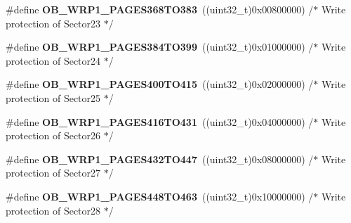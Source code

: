 \begin{DoxyCompactItemize}
\item 
\hypertarget{group___f_l_a_s_h_ex___option___bytes___write___protection1_gab63edd9507ffc8a666133e9735efe17d}{\#define {\bfseries O\-B\-\_\-\-W\-R\-P1\-\_\-\-P\-A\-G\-E\-S368\-T\-O383}~((uint32\-\_\-t)0x00800000) /$\ast$ Write protection of Sector23 $\ast$/}\label{group___f_l_a_s_h_ex___option___bytes___write___protection1_gab63edd9507ffc8a666133e9735efe17d}

\item 
\hypertarget{group___f_l_a_s_h_ex___option___bytes___write___protection1_ga472584f0513bbaf9c290be53cfcff550}{\#define {\bfseries O\-B\-\_\-\-W\-R\-P1\-\_\-\-P\-A\-G\-E\-S384\-T\-O399}~((uint32\-\_\-t)0x01000000) /$\ast$ Write protection of Sector24 $\ast$/}\label{group___f_l_a_s_h_ex___option___bytes___write___protection1_ga472584f0513bbaf9c290be53cfcff550}

\item 
\hypertarget{group___f_l_a_s_h_ex___option___bytes___write___protection1_gaffe45cf6ef12157253e8cd4d8198ddfc}{\#define {\bfseries O\-B\-\_\-\-W\-R\-P1\-\_\-\-P\-A\-G\-E\-S400\-T\-O415}~((uint32\-\_\-t)0x02000000) /$\ast$ Write protection of Sector25 $\ast$/}\label{group___f_l_a_s_h_ex___option___bytes___write___protection1_gaffe45cf6ef12157253e8cd4d8198ddfc}

\item 
\hypertarget{group___f_l_a_s_h_ex___option___bytes___write___protection1_ga303b2306543406e7e3e248950b2cb6a3}{\#define {\bfseries O\-B\-\_\-\-W\-R\-P1\-\_\-\-P\-A\-G\-E\-S416\-T\-O431}~((uint32\-\_\-t)0x04000000) /$\ast$ Write protection of Sector26 $\ast$/}\label{group___f_l_a_s_h_ex___option___bytes___write___protection1_ga303b2306543406e7e3e248950b2cb6a3}

\item 
\hypertarget{group___f_l_a_s_h_ex___option___bytes___write___protection1_ga6da4ac653ed25a8ceb52d4aeed47b63a}{\#define {\bfseries O\-B\-\_\-\-W\-R\-P1\-\_\-\-P\-A\-G\-E\-S432\-T\-O447}~((uint32\-\_\-t)0x08000000) /$\ast$ Write protection of Sector27 $\ast$/}\label{group___f_l_a_s_h_ex___option___bytes___write___protection1_ga6da4ac653ed25a8ceb52d4aeed47b63a}

\item 
\hypertarget{group___f_l_a_s_h_ex___option___bytes___write___protection1_ga3daebad83275c64d5b6d98a5e87b604d}{\#define {\bfseries O\-B\-\_\-\-W\-R\-P1\-\_\-\-P\-A\-G\-E\-S448\-T\-O463}~((uint32\-\_\-t)0x10000000) /$\ast$ Write protection of Sector28 $\ast$/}\label{group___f_l_a_s_h_ex___option___bytes___write___protection1_ga3daebad83275c64d5b6d98a5e87b604d}


\end{DoxyCompactItemize}
